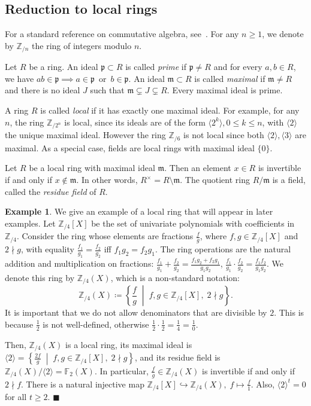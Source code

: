 \documentclass[letterpaper, 11pt, thm-restate]{article}
\numberwithin{equation}{section}
\newcommand{\Z}{\mathbb{Z}}
\newcommand{\F}{\mathbb{F}}
\newcommand{\gen}[1]{\langle {#1} \rangle}
\newcommand{\frp}{\mathfrak{p}}
\newcommand{\frm}{\mathfrak{m}}
\theoremstyle{definition}
\theoremstyle{definition}
\newtheorem{example}[theorem]{Example}
\theoremstyle{definition}
\begin{document}
\subsection{Reduction to local rings}
For a standard reference on commutative algebra, see~\cite{atiyah1969introduction}.
For any $n \geq 1$, we denote by $\Z_{/n}$ the ring of integers modulo $n$.

Let $R$ be a ring.
An ideal $\frp \subset R$ is called \emph{prime} if $\frp \neq R$ and for every $a, b \in R$, we have $ab \in \frp \implies a \in \frp \,\text{ or }\, b \in \frp$.
An ideal $\frm \subset R$ is called \emph{maximal} if $\frm \neq R$ and there is no ideal $J$ such that $\frm \subsetneq J \subsetneq R$.
Every maximal ideal is prime.

A ring $R$ is called \emph{local} if it has exactly one maximal ideal.
For example, for any $n$, the ring $\Z_{/2^n}$ is local, since its ideals are of the form $\gen{2^k}, 0 \leq k \leq n$, with $\gen{2}$ the unique maximal ideal.
However the ring $\Z_{/6}$ is not local since both $\gen{2}, \gen{3}$ are maximal.
As a special case, fields are local rings with maximal ideal $\{0\}$.

Let $R$ be a local ring with maximal ideal $\frm$.
Then an element $x \in R$ is invertible if and only if $x \notin \frm$.
In other words, $R^{\times} = R \setminus \frm$.
The quotient ring $R/\frm$ is a field, called the \emph{residue field} of $R$.

\begin{example}\label{example:Z4}
    We give an example of a local ring that will appear in later examples.
    Let $\Z_{/4}[X]$ be the set of univariate polynomials with coefficients in $\Z_{/4}$.
    Consider the ring whose elements are fractions $\frac{f}{g}$, where $f, g \in \Z_{/4}[X]$ and $2 \nmid g$, with equality $\frac{f_1}{g_1} = \frac{f_2}{g_2}$ iff $f_1 g_2 = f_2 g_1$.
    The ring operations are the natural addition and multiplication on fractions: $\frac{f_1}{g_1} + \frac{f_2}{g_2} = \frac{f_1 g_2 + f_2 g_1}{g_1g_2}$, $\frac{f_1}{g_1} \cdot \frac{f_2}{g_2} = \frac{f_1 f_2}{g_1g_2}$.
    We denote this ring by $\Z_{/4}(X)$, which is a non-standard notation:
    \[
    \Z_{/4}(X) \coloneqq \left\{\frac{f}{g} \;\middle|\; f, g \in \Z_{/4}[X],\; 2 \nmid g \right\}.
    \]
    It is important that we do not allow denominators that are divisible by $2$.
    This is because $\frac{1}{2}$ is not well-defined, otherwise $\frac{1}{2} \cdot \frac{1}{2} = \frac{1}{4} = \frac{1}{0}$.
    
    Then, $\Z_{/4}(X)$ is a local ring, its maximal ideal is $\gen{2} = \left\{\frac{2f}{g} \;\middle|\; f, g \in \Z_{/4}[X],\; 2 \nmid g \right\}$, and its residue field is $\Z_{/4}(X) / \gen{2} = \F_2(X)$.
    In particular, $\frac{f}{g} \in \Z_{/4}(X)$ is invertible if and only if $2 \nmid f$.
    There is a natural injective map $\Z_{/4}[X] \hookrightarrow \Z_{/4}(X),\; f \mapsto \frac{f}{1}$.
    Also, $\gen{2}^t=0$ for all $t \geq 2$.
    \hfill $\blacksquare$
\end{example}
\end{document}
